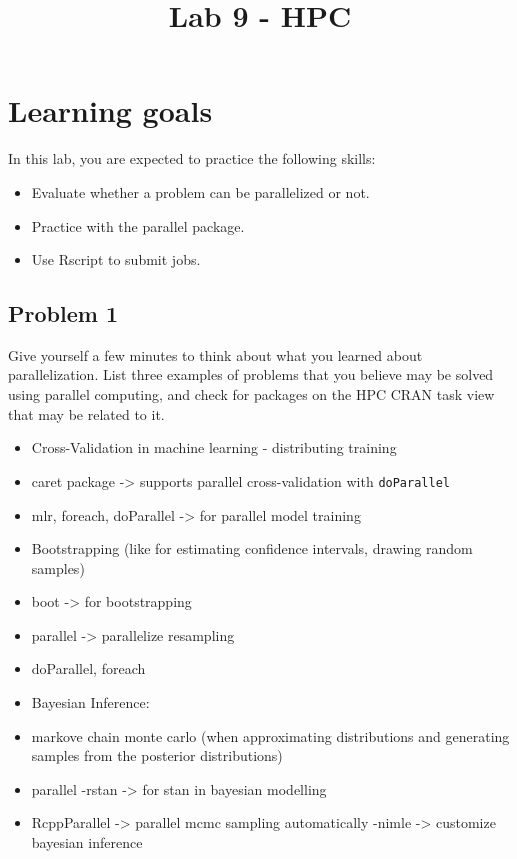 \documentclass[
]{article}
\title{Lab 9 - HPC}
\author{}
\date{\vspace{-2.5em}}
\providecommand{\tightlist}{%
  \setlength{\itemsep}{0pt}\setlength{\parskip}{0pt}}
\begin{document}
\maketitle

\section{Learning goals}\label{learning-goals}

In this lab, you are expected to practice the following skills:

\begin{itemize}
\tightlist
\item
  Evaluate whether a problem can be parallelized or not.
\item
  Practice with the parallel package.
\item
  Use Rscript to submit jobs.
\end{itemize}

\subsection{Problem 1}\label{problem-1}

Give yourself a few minutes to think about what you learned about
parallelization. List three examples of problems that you believe may be
solved using parallel computing, and check for packages on the HPC CRAN
task view that may be related to it.

\begin{itemize}
\item
  Cross-Validation in machine learning - distributing training
\item
  caret package -\textgreater{} supports parallel cross-validation with
  \texttt{doParallel}
\item
  mlr, foreach, doParallel -\textgreater{} for parallel model training
\item
  Bootstrapping (like for estimating confidence intervals, drawing
  random samples)
\item
  boot -\textgreater{} for bootstrapping
\item
  parallel -\textgreater{} parallelize resampling
\item
  doParallel, foreach
\item
  Bayesian Inference:
\item
  markove chain monte carlo (when approximating distributions and
  generating samples from the posterior distributions)\\
\item
  parallel -rstan -\textgreater{} for stan in bayesian modelling
\item
  RcppParallel -\textgreater{} parallel mcmc sampling automatically
  -nimle -\textgreater{} customize bayesian inference
\end{itemize}
\end{document}
